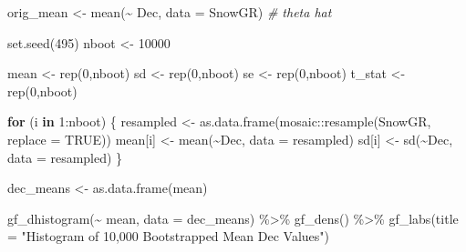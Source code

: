 \documentclass[12pt]{article}
\newenvironment{Shaded}{\begin{snugshade}}{\end{snugshade}}
\newcommand{\AttributeTok}[1]{\textcolor[rgb]{0.77,0.63,0.00}{#1}}
\newcommand{\CommentTok}[1]{\textcolor[rgb]{0.56,0.35,0.01}{\textit{#1}}}
\newcommand{\ConstantTok}[1]{\textcolor[rgb]{0.00,0.00,0.00}{#1}}
\newcommand{\ControlFlowTok}[1]{\textcolor[rgb]{0.13,0.29,0.53}{\textbf{#1}}}
\newcommand{\DecValTok}[1]{\textcolor[rgb]{0.00,0.00,0.81}{#1}}
\newcommand{\FunctionTok}[1]{\textcolor[rgb]{0.00,0.00,0.00}{#1}}
\newcommand{\NormalTok}[1]{#1}
\newcommand{\OtherTok}[1]{\textcolor[rgb]{0.56,0.35,0.01}{#1}}
\newcommand{\SpecialCharTok}[1]{\textcolor[rgb]{0.00,0.00,0.00}{#1}}
\newcommand{\StringTok}[1]{\textcolor[rgb]{0.31,0.60,0.02}{#1}}
\begin{document}
\begin{Shaded}
\begin{Highlighting}[]
\NormalTok{orig\_mean }\OtherTok{\textless{}{-}} \FunctionTok{mean}\NormalTok{(}\SpecialCharTok{\textasciitilde{}}\NormalTok{ Dec, }\AttributeTok{data =}\NormalTok{ SnowGR) }\CommentTok{\# theta hat}

\FunctionTok{set.seed}\NormalTok{(}\DecValTok{495}\NormalTok{)}
\NormalTok{nboot }\OtherTok{\textless{}{-}} \DecValTok{10000}

\NormalTok{mean }\OtherTok{\textless{}{-}} \FunctionTok{rep}\NormalTok{(}\DecValTok{0}\NormalTok{,nboot)}
\NormalTok{sd }\OtherTok{\textless{}{-}} \FunctionTok{rep}\NormalTok{(}\DecValTok{0}\NormalTok{,nboot)}
\NormalTok{se }\OtherTok{\textless{}{-}} \FunctionTok{rep}\NormalTok{(}\DecValTok{0}\NormalTok{,nboot)}
\NormalTok{t\_stat }\OtherTok{\textless{}{-}} \FunctionTok{rep}\NormalTok{(}\DecValTok{0}\NormalTok{,nboot)}

\ControlFlowTok{for}\NormalTok{ (i }\ControlFlowTok{in} \DecValTok{1}\SpecialCharTok{:}\NormalTok{nboot) \{}
\NormalTok{  resampled }\OtherTok{\textless{}{-}} \FunctionTok{as.data.frame}\NormalTok{(mosaic}\SpecialCharTok{::}\FunctionTok{resample}\NormalTok{(SnowGR, }\AttributeTok{replace =} \ConstantTok{TRUE}\NormalTok{))}
\NormalTok{  mean[i] }\OtherTok{\textless{}{-}} \FunctionTok{mean}\NormalTok{(}\SpecialCharTok{\textasciitilde{}}\NormalTok{Dec, }\AttributeTok{data =}\NormalTok{ resampled)}
\NormalTok{  sd[i] }\OtherTok{\textless{}{-}} \FunctionTok{sd}\NormalTok{(}\SpecialCharTok{\textasciitilde{}}\NormalTok{Dec, }\AttributeTok{data =}\NormalTok{ resampled)}
\NormalTok{\}}

\NormalTok{dec\_means }\OtherTok{\textless{}{-}} \FunctionTok{as.data.frame}\NormalTok{(mean)}
\end{Highlighting}
\end{Shaded}

\begin{Shaded}
\begin{Highlighting}[]
\FunctionTok{gf\_dhistogram}\NormalTok{(}\SpecialCharTok{\textasciitilde{}}\NormalTok{ mean, }\AttributeTok{data =}\NormalTok{ dec\_means) }\SpecialCharTok{\%\textgreater{}\%}
  \FunctionTok{gf\_dens}\NormalTok{() }\SpecialCharTok{\%\textgreater{}\%}
  \FunctionTok{gf\_labs}\NormalTok{(}\AttributeTok{title =} \StringTok{"Histogram of 10,000 Bootstrapped Mean Dec Values"}\NormalTok{)}
\end{Highlighting}
\end{Shaded}
\end{document}
